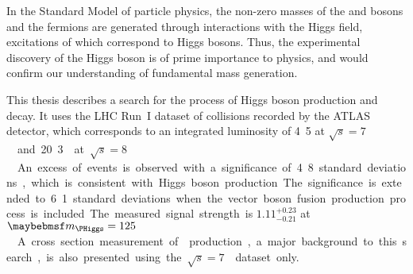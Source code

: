 
In the Standard Model of particle physics, the non-zero masses of the \PW and \PZ bosons and 
the fermions are generated through interactions with the Higgs field, excitations of which 
correspond to Higgs bosons. Thus, the experimental discovery of the Higgs boson is of prime 
importance to physics, and would confirm our understanding of fundamental mass generation.

This thesis describes a search for the \ggHWWlvlv process of Higgs boson production and decay.
It uses the LHC Run~I dataset of \pp collisions recorded by the ATLAS detector, which 
corresponds to an integrated luminosity of \unit{4.5}{\invfb} at \unit{$\sqrt{s} = 7$}{\TeV} 
and \unit{20.3}{\invfb} at \unit{$\sqrt{s} = 8$}{\TeV}. An excess of events is observed with 
a significance of 4.8 standard deviations, which is consistent with Higgs boson production. 
The significance is extended to 6.1 standard deviations when the vector boson fusion 
production process is included. The measured signal strength is $1.11^{+0.23}_{-0.21}$ at 
\unit{$\mH = 125$}{\GeV}. A cross section measurement of \WW production, a major background 
to this search, is also presented using the \unit{$\sqrt{s} = 7$}{\TeV} dataset only.
